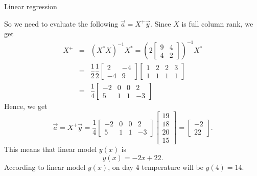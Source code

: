 \begin{problem}{Linear regression}
\begin{solution}
$$                $$
                So we need to evaluate the following $\vec{a}=X^+\vec{y}$. Since $X$ is full column rank, we get 
                \begin{eqnarray}
                    X^+&=&(X^*X)^{-1}X^*
                    =\left(2
                    \begin{bmatrix}
                        9 & 4\\
                        4 & 2
                    \end{bmatrix}
                    \right)^{-1}
                    X^*\nonumber\\
                    &=&
                    \dfrac{1}{2}
                    \dfrac{1}{2}
                    \begin{bmatrix}
                        2 & -4\\
                        -4 & 9
                    \end{bmatrix}
                    \begin{bmatrix}
                        1 & 2 & 2 & 3\\
                        1 & 1 & 1 & 1
                    \end{bmatrix}\nonumber\\
                    &=&
                    \dfrac{1}{4}
                    \begin{bmatrix}
                        -2 & 0 & 0 & 2\\
                        5 & 1 & 1 & -3
                    \end{bmatrix}\nonumber
                \end{eqnarray}
                Hence, we get
                $$
                    \vec{a}=
                    X^+\vec{y}=
                    \dfrac{1}{4}
                    \begin{bmatrix}
                        -2 & 0 & 0 & 2\\
                        5 & 1 & 1 & -3
                    \end{bmatrix} 
                    \begin{bmatrix}
                        19\\
                        18\\
                        20\\
                        15
                    \end{bmatrix}
                    =
                    \begin{bmatrix}
                        -2\\
                        22
                    \end{bmatrix}.
                $$
                This means that linear model $y(x)$ is 
                $$
                    y(x)=-2x+22.
                $$
                According to linear model $y(x)$, on day 4 temperature will be $y(4)=14$\textdegree.
            \end{solution}
        \end{problem}
